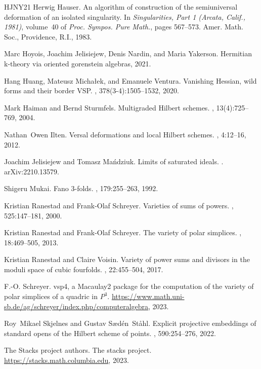 \documentclass{amsart}
\begin{document}
\begin{thebibliography}{HJNY21}
Herwig Hauser.
\newblock An algorithm of construction of the semiuniversal deformation of an
  isolated singularity.
\newblock In {\em Singularities, {P}art 1 ({A}rcata, {C}alif., 1981)},
  volume~40 of {\em Proc. Sympos. Pure Math.}, pages 567--573. Amer. Math.
  Soc., Providence, R.I., 1983.

Marc Hoyois, Joachim Jelisiejew, Denis Nardin, and Maria Yakerson.
\newblock Hermitian k-theory via oriented gorenstein algebras, 2021.

Hang Huang, Mateusz Micha{\l}ek, and Emanuele Ventura.
\newblock Vanishing {H}essian, wild forms and their border {VSP}.
, 378(3-4):1505--1532, 2020.

Mark Haiman and Bernd Sturmfels.
\newblock Multigraded {H}ilbert schemes.
, 13(4):725--769, 2004.

Nathan~Owen Ilten.
\newblock Versal deformations and local {H}ilbert schemes.
, 4:12--16, 2012.

Joachim Jelisiejew and Tomasz Ma{\'{n}}dziuk.
\newblock Limits of saturated ideals.
.
\newblock arXiv:2210.13579.

Shigeru Mukai.
\newblock Fano 3-folds.
, 179:255--263, 1992.

Kristian Ranestad and Frank-Olaf Schreyer.
\newblock Varieties of sums of powers.
, 525:147--181, 2000.

Kristian Ranestad and Frank-Olaf Schreyer.
\newblock The variety of polar simplices.
, 18:469--505, 2013.

Kristian Ranestad and Claire Voisin.
\newblock Variety of power sums and divisors in the moduli space of cubic
  fourfolds.
, 22:455--504, 2017.

F.-O. Schreyer.
\newblock vsp4, a {M}acaulay2 package for the computation of the variety of
  polar simplices of a quadric in {$P^3$}.
\newblock
  \url{https://www.math.uni-sb.de/ag/schreyer/index.php/computeralgebra}, 2023.

Roy~Mikael Skjelnes and Gustav S{\ae}d\'{e}n~St{\aa}hl.
\newblock Explicit projective embeddings of standard opens of the {H}ilbert
  scheme of points.
, 590:254--276, 2022.

The {Stacks project authors}.
\newblock The stacks project.
\newblock \url{https://stacks.math.columbia.edu}, 2023.

\end{thebibliography}
\end{document}

